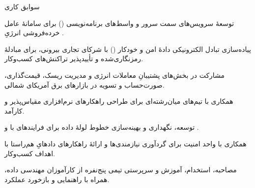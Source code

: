 \documentclass[11pt]{article}
\begin{document}
\begin{faSection}{سوابق کاری}

\begin{faItems}
  \item توسعۀ سرویس‌های سمت سرور و واسط‌های برنامه‌نویسی () برای سامانۀ عامل خرده‌فروشی انرژیِ .
  \item پیاده‌سازی تبادل الکترونیکی دادۀ امن و خودکار () با شرکای تجاری بیرونی، برای مبادلۀ رمزنگاری‌شده و تأییدپذیر تراکنش‌های کسب‌وکار.
  \item مشارکت در بخش‌های پشتیبانِ معاملات انرژی و مدیریت ریسک، قیمت‌گذاری، صورت‌حساب و تسویه در بازارهای برق آمریکای شمالی.
  \item همکاری با تیم‌های میان‌رشته‌ای برای طراحی راهکارهای نرم‌افزاری مقیاس‌پذیر و کارآمد.
\end{faItems}

\begin{faItems}
  \item توسعه، نگهداری و بهینه‌سازی خطوط لولۀ داده برای فرایندهای  با  و .
  \item همکاری با واحد امنیت برای گردآوری نیازمندی‌ها و ارائۀ راهکارهای دادهایِ هم‌راستا با اهداف کسب‌وکار.
  \item مصاحبه، استخدام، آموزش و سرپرستی تیمی پنج‌نفره از کارآموزان مهندسی داده، همراه با راهنمایی و بازخورد عملکرد.
\end{faItems}

\end{faSection}
\end{document}
